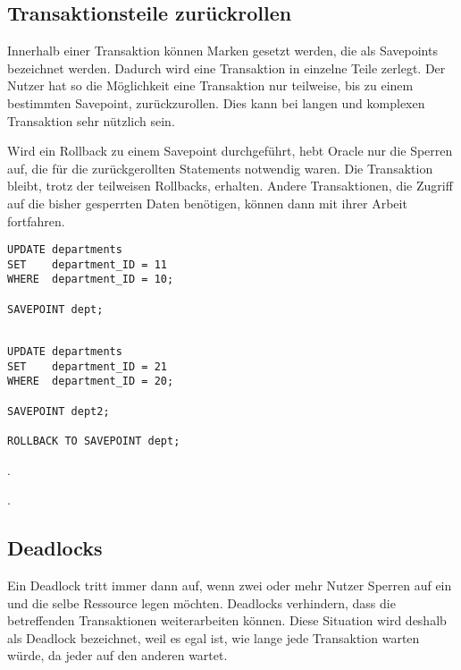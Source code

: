       \subsection{Transaktionsteile zurückrollen}
        Innerhalb einer Transaktion können Marken gesetzt werden, die als Savepoints bezeichnet werden. Dadurch wird eine Transaktion in einzelne Teile zerlegt. Der Nutzer hat so die Möglichkeit eine Transaktion nur teilweise, bis zu einem bestimmten Savepoint, zurückzurollen. Dies kann bei langen und komplexen Transaktion sehr nützlich sein.

        Wird ein Rollback zu einem Savepoint durchgeführt, hebt Oracle nur die Sperren auf, die für die zurückgerollten Statements notwendig waren. Die Transaktion bleibt, trotz der teilweisen Rollbacks, erhalten. Andere Transaktionen, die Zugriff auf die bisher gesperrten Daten benötigen, können dann mit ihrer Arbeit fortfahren.

        \begin{lstlisting}[caption={Einen Savepoint setzen},label=admin403,language=oracle_sql]
UPDATE departments
SET    department_ID = 11
WHERE  department_ID = 10;

SAVEPOINT dept;
        \end{lstlisting}
        \begin{lstlisting}[caption={Rollback zu einem Savepoint},label=admin404,language=oracle_sql]
        
UPDATE departments
SET    department_ID = 21
WHERE  department_ID = 20;

SAVEPOINT dept2;

ROLLBACK TO SAVEPOINT dept;
        \end{lstlisting}
        \begin{literaturinternet}
          \item \cite[Konkurrierende Zugriffe und Datenkonsistenz]{dataconcurrencyandconsistency}.
          \item \cite[Transaktionsverwaltung]{transactionmanagement}.
        \end{literaturinternet}
      \subsection{Deadlocks}
        Ein Deadlock tritt immer dann auf, wenn zwei oder mehr Nutzer Sperren auf ein und die selbe Ressource legen möchten. Deadlocks verhindern, dass die betreffenden Transaktionen weiterarbeiten können. Diese Situation wird deshalb als Deadlock bezeichnet, weil es egal ist, wie lange jede Transaktion warten würde, da jeder auf den anderen wartet.

